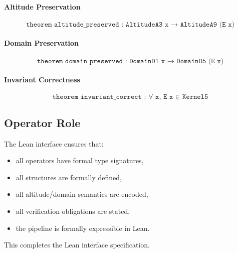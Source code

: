 \paragraph{Altitude Preservation}
\[
\texttt{theorem altitude\_preserved :
  AltitudeA3 x → AltitudeA9 (E x)}
\]

\paragraph{Domain Preservation}
\[
\texttt{theorem domain\_preserved :
  DomainD1 x → DomainD5 (E x)}
\]

\paragraph{Invariant Correctness}
\[
\texttt{theorem invariant\_correct :
  ∀ x, E x ∈ Kernel5}
\]

\subsection{Operator Role}

The Lean interface ensures that:

\begin{itemize}
    \item all operators have formal type signatures,
    \item all structures are formally defined,
    \item all altitude/domain semantics are encoded,
    \item all verification obligations are stated,
    \item the pipeline is formally expressible in Lean.
\end{itemize}

This completes the Lean interface specification.
